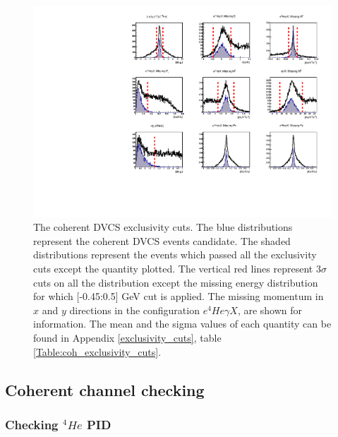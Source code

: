 \begin{figure}[!h]
\centering
\includegraphics[scale=0.9]{fig_Dec2016/all_coh_exc_cuts.pdf}
\caption{The coherent DVCS exclusivity cuts. The blue distributions represent 
   the coherent DVCS events candidate. The shaded distributions represent the 
   events which passed all the exclusivity cuts except the quantity plotted.  
   The vertical red lines represent $3\sigma$ cuts on all the distribution 
   except the missing energy distribution for which [-0.45:0.5] GeV cut is 
   applied.  The missing momentum in $x$ and $y$ directions in the 
configuration $e^{4}He\gamma X$, are shown for information. The mean and the 
sigma values of each quantity can be found in Appendix \ref{exclusivity_cuts}, 
table \ref{Table:coh_exclusivity_cuts}.} \label{fig:coh_exclusivty_cuts}
\end{figure}

\subsection{Coherent channel checking}

\subsubsection{Checking $^{4}He$ PID}


